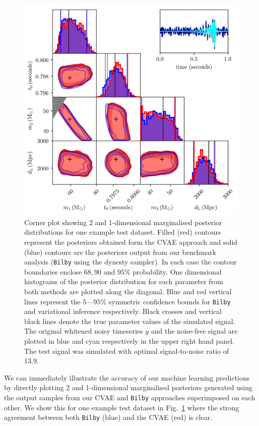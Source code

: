 \documentclass[%
showpacs,
 amsmath,amssymb,
 aps,
 twocolumn,
 prl,
 reprint,
floatfix,
]{revtex4-1}
\begin{document}
%
%
\begin{figure}
    \includegraphics[width=\textwidth]{images/corner_testcase0.png}
    \caption{\label{fig:corner_plot} Corner plot showing 2 and 1-dimensional
marginalised posterior distributions for one example test dataset. Filled (red)
contours represent the posteriors obtained form the \ac{CVAE} approach and
solid (blue) contours are the posteriors output from our benchmark analysis
(\texttt{Bilby} using the dynesty sampler). In each case the contour boundaries
enclose $68,90$ and $95\%$ probability. One dimensional histograms of the
posterior distribution for each parameter from both methods are plotted along
the diagonal. Blue and red vertical lines represent the $5$---$95\%$ symmetric
confidence bounds for \texttt{Bilby} and variational inference respectively.
Black crosses and vertical black lines denote the true parameter values of the
simulated signal. The original whitened noisy timeseries $y$ and the noise-free
signal are plotted in blue and cyan respectively in the upper right hand
panel. The test signal was simulated with optimal signal-to-noise ratio of
13.9.}
\end{figure}

%
%
We can immediately illustrate the accuracy of our machine learning predictions
by directly plotting 2 and 1-dimensional marginalised posteriors generated
using the output samples from our \ac{CVAE} and \texttt{Bilby} approaches
superimposed on each other. We show this for one example test dataset in
Fig.~\ref{fig:corner_plot} where the strong agreement between both
\texttt{Bilby} (blue) and the \ac{CVAE} (red) is clear. 
\end{document}
